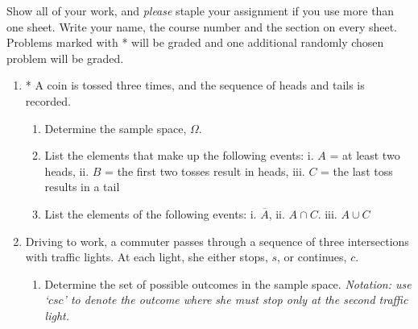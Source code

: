 \documentclass[10pt]{article}
\newcommand{\ansfont}[1]{{\textcolor{blue}{\textbf{Answer:}}\ \ #1}}
\renewcommand{\ansfont}[1]{}
\begin{document}
\pagestyle{fancy} 
Show all of your work, and \emph{please} staple your assignment if you use more than one sheet. Write your name, the course number and the section on every sheet. Problems marked with * will be graded and one additional randomly chosen problem will be graded.

\begin{enumerate} 
  \item * A coin is tossed three times, and the sequence of heads and tails is recorded.
    \begin{enumerate}
      \item Determine the sample space, $\Omega$.
      \item List the elements that make up the following events: i. $A$ = at least two heads,
        ii. $B$ = the first two tosses result in heads, iii. $C$ = the last toss results in a tail
      \item List the elements of the following events: i. $\overline{A}$, ii. $A\cap C$. iii. $A \cup C$
    \end{enumerate}
    \ansfont{
      \begin{enumerate}
        \item Let $H$ and $T$ stand for the events of head and tail, respectively. \emph{Ergo}, the sample space is
          $$\Omega=\{HHH, HHT, HTH, HTT, THH, THT, TTH, TTT\}$$
        \item \begin{enumerate}
            \item $A=\text{at least two heads}=\{HHH, HHT, THH, HTH\}$
            \item $B=\text{the first two tosses result in heads}=\{HHT, HHH\}$
            \item $C=\text{the last toss results in a tail}=\{HHT, HTT, THT, TTT\}$
          \end{enumerate}
        \item \begin{enumerate}
            \item $\bar{A}=\Omega\setminus A=\{HTT, THT, TTH, TTT\}=\text{at most one head}$
            \item $A\cap C=\{HHT\}$
            \item $A\cup C=\{HHH, HHT, THH, HTH, HTT, THT, TTT\}=$ at least two heads or the last toss results in a tail
          \end{enumerate}
      \end{enumerate}
    }

  \item
    Driving to work, a commuter passes through a sequence of three
    intersections with traffic lights. At each light, she either stops, $s$, or continues, $c$.
    \begin{enumerate}
      \item %
        \label{lights}
        Determine the set of possible outcomes in the sample space.
        \emph{Notation: use `$csc$' to denote the outcome where she must stop only at the second traffic light.}




\end{enumerate}
\end{enumerate}
\end{document}
